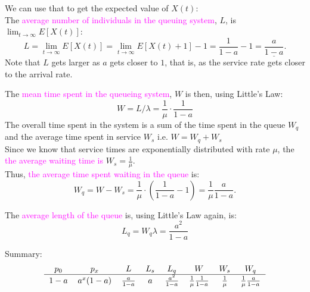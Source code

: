 \documentclass[20pt,landscape]{foils}
\newcommand{\no}{\noindent}
\begin{document}
{{\foilhead[-.8in]{\textcolor{blue}{The $M/M/1$ Queue (cont'd)}}\vspace*{1mm}
\no We can use that to get the expected value of $X(t)$:\\[.1in]
\no The {\textcolor{magenta}{average number of individuals in the queuing system}}, $L$, is $\lim_{t 
\rightarrow \infty} E[X(t)]$:
\[
L = \lim_{t 
\rightarrow \infty} E[X(t)] = \lim_{t 
\rightarrow \infty} E[X(t)+1] -1= \frac{1}{1-a} - 1 = \underline {\frac{a}{1-a}}.
\]
\no Note that $L$ gets larger as $a$ gets closer to $1$, that is, as the service rate gets closer to the arrival rate.\\[.1in]
\no {\textcolor{red}{Thus, the closer the service rate is to the arrival rate, the larger is the 
expected number of people in the system.}}

\foilhead[-.8in]{\textcolor{blue}{The $M/M/1$ Queue (cont'd)}}\vspace*{1mm}
\no  The {\textcolor{magenta}{mean time spent in the queueing system}}, $W$ is then, 
using Little's Law:
\[
W =  L/ \lambda = \frac{1}{\mu} \cdot \frac{1}{1-a}
\]
\no The overall time spent in the system is a sum of the time spent in the queue $W_{q}$ and the average time spent in 
service $W_{s}$ i.e. $W=W_{q}+W_{s}$\\[.1in]
\no Since we know that service  times are exponentially distributed with rate $\mu$,  the {\textcolor{magenta}{the average waiting time is}} $W_{s} = \frac{1}{\mu}$.\\[.1in]
\no Thus, {\textcolor{magenta}{the average time spent waiting in the queue}} is:
\[
W_{q} = W - W_{s} = \frac{1}{\mu}\cdot \left ( \frac{1}{1-a} - 1 \right ) = 
\frac{1}{\mu}\frac{a}{1-a}.
\] 

\foilhead[-.8in]{\textcolor{blue}{The $M/M/1$ Queue (cont'd)}}\vspace*{1mm}
\no The {\textcolor{magenta}{average length of the queue}} 
is, using Little's Law again, is:
\[
L_{q} = W_{q} \lambda = \frac{a^{2}}{1-a}
\]

Summary:
\[\begin{tabular}{cccccccc}
 $p_0$ & $p_x$ & $L$ & $L_s$ & $L_q$ & $W$ & $W_s$  & $W_q$\\\hline
 $1-a$ & $a^x(1-a)$ & $\frac{a}{1-a}$ &
$a$ & $\frac{a^2}{1-a}$ & $\frac{1}{\mu}\frac{1}{1-a}$ & $\frac{1}{\mu}$
& $\frac{1}{\mu}\frac{a}{1-a}$
\end{tabular}\]


}}
\end{document}
